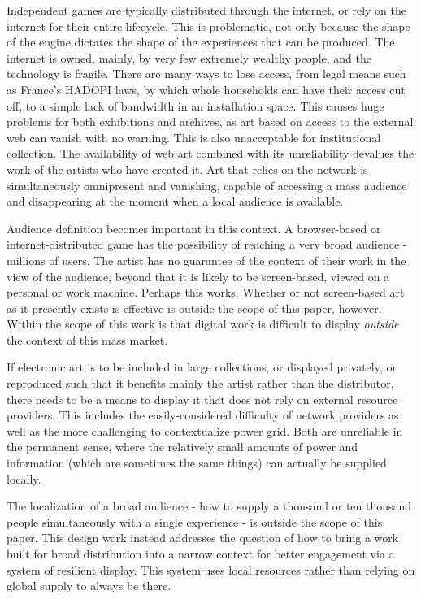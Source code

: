 Independent games are typically distributed through the internet, or rely on the internet for their entire lifecycle. This is problematic, not only because the shape of the engine dictates the shape of the experiences that can be produced. The internet is owned, mainly, by very few extremely wealthy people, and the technology is fragile. There are many ways to lose access, from legal means such as France's HADOPI laws, by which whole households can have their access cut off, to a simple lack of bandwidth in an installation space. This causes huge problems for both exhibitions and archives, as art based on access to the external web can vanish with no warning. This is also unacceptable for institutional collection. The availability of web art combined with its unreliability devalues the work of the artists who have created it. Art that relies on the network is simultaneously omnipresent and vanishing, capable of accessing a mass audience and disappearing at the moment when a local audience is available.

Audience definition becomes important in this context. A browser-based or internet-distributed game has the possibility of reaching a very broad audience - millions of users. The artist has no guarantee of the context of their work in the view of the audience, beyond that it is likely to be screen-based, viewed on a personal or work machine. Perhaps this works. Whether or not screen-based art as it presently exists is effective is outside the scope of this paper, however. Within the scope of this work is that digital work is difficult to display \textit{outside} the context of this mass market.

If electronic art is to be included in large collections, or displayed privately, or reproduced such that it benefits mainly the artist rather than the distributor, there needs to be a means to display it that does not rely on external resource providers. This includes the easily-considered difficulty of network providers as well as the more challenging to contextualize power grid. Both are unreliable in the permanent sense, where the relatively small amounts of power and information (which are sometimes the same things) can actually be supplied locally. 

The localization of a broad audience - how to supply a thousand or ten thousand people simultaneously with a single experience - is outside the scope of this paper. This design work instead addresses the question of how to bring a work built for broad distribution into a narrow context for better engagement via a system of resilient display. This system uses local resources rather than relying on global supply to always be there.

